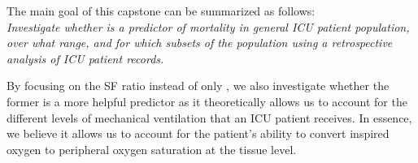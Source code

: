 The main goal of this capstone can be summarized as follows: \\
\textit{ Investigate whether \SF is a predictor of mortality in general ICU patient population, over what range, and for which subsets of the population using a retrospective analysis of ICU patient records.
}

By focusing on the SF ratio instead of only \Sp, we also investigate whether the former is a more helpful predictor as it theoretically allows us to account for the different levels of mechanical ventilation that an ICU patient receives. In essence, we believe it allows us to account for the patient's ability to convert inspired oxygen to peripheral oxygen saturation at the tissue level. 






